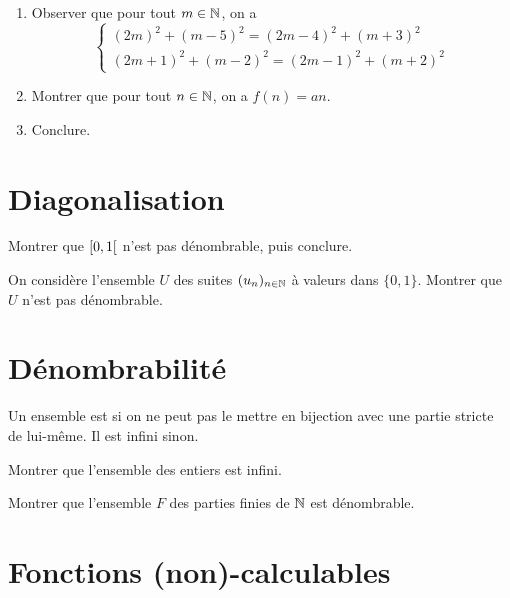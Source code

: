 \documentclass[french,a4paper,10pt]{article}
\begin{document}
\begin{td-exo}[]
\begin{enumerate}
			\item Observer que pour tout $m\in \mathbb{N}$, on a
				\[
				\begin{cases}
					(2m)^2+(m-5)^2=(2m-4)^2+(m+3)^2\\
					(2m+1)^2+(m-2)^2=(2m-1)^2+(m+2)^2
				\end{cases}
				\]
				
			\item Montrer que pour tout $n\in\mathbb{N}$, on a $f(n)=an$.
			
			\item Conclure.
		\end{enumerate}
		
	\end{td-exo}
	
	\section{Diagonalisation}
	
	\begin{td-exo}[]
		Montrer que $\mathopen{[}0,1\mathclose{[}$ n'est pas dénombrable, puis conclure.
		
	\end{td-exo}
	
	\begin{td-exo}[]
		On considère l'ensemble $U$ des suites $(u_n)_{n\in \mathbb{N}}$ à valeurs dans $\{0,1\}$. Montrer que $U$ n'est pas dénombrable.
		
	\end{td-exo}
	
	\section{Dénombrabilité}
	
	\begin{td-exo}[]
		Un ensemble est  si on ne peut pas le mettre en bijection avec une partie stricte de lui-même. Il est infini sinon.
		
		Montrer que l'ensemble des entiers est infini.
		
	\end{td-exo}
	
	\begin{td-exo}[]
		Montrer que l'ensemble $F$ des parties finies de $\mathbb{N}$ est dénombrable.
		
	\end{td-exo}
	
	\section{Fonctions (non)-calculables}
	
\end{document}
